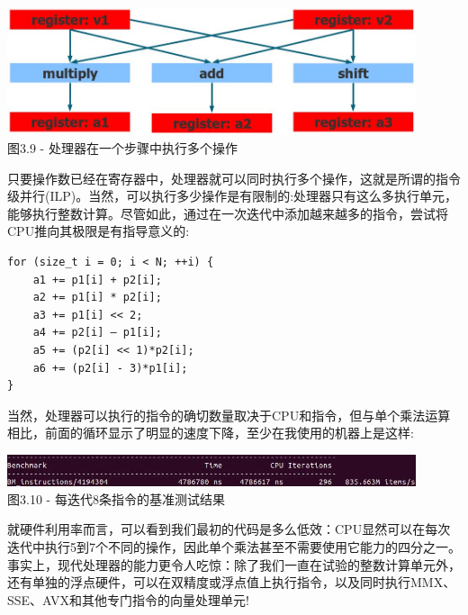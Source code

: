 \hspace*{\fill} \\ %
\begin{center}
\includegraphics[width=0.9\textwidth]{content/1/chapter3/images/9.jpg}\\
图3.9 - 处理器在一个步骤中执行多个操作
\end{center}

只要操作数已经在寄存器中，处理器就可以同时执行多个操作，这就是所谓的指令级并行(ILP)。当然，可以执行多少操作是有限制的:处理器只有这么多执行单元，能够执行整数计算。尽管如此，通过在一次迭代中添加越来越多的指令，尝试将CPU推向其极限是有指导意义的:

\begin{lstlisting}[style=styleCXX]
for (size_t i = 0; i < N; ++i) {
	a1 += p1[i] + p2[i];
	a2 += p1[i] * p2[i];
	a3 += p1[i] << 2;
	a4 += p2[i] – p1[i];
	a5 += (p2[i] << 1)*p2[i];
	a6 += (p2[i] - 3)*p1[i];
}
\end{lstlisting}

当然，处理器可以执行的指令的确切数量取决于CPU和指令，但与单个乘法运算相比，前面的循环显示了明显的速度下降，至少在我使用的机器上是这样:

\begin{center}
\includegraphics[width=0.9\textwidth]{content/1/chapter3/images/10.jpg}\\
图3.10 - 每迭代8条指令的基准测试结果
\end{center}

就硬件利用率而言，可以看到我们最初的代码是多么低效：CPU显然可以在每次迭代中执行5到7个不同的操作，因此单个乘法甚至不需要使用它能力的四分之一。事实上，现代处理器的能力更令人吃惊：除了我们一直在试验的整数计算单元外，还有单独的浮点硬件，可以在双精度或浮点值上执行指令，以及同时执行MMX、SSE、AVX和其他专门指令的向量处理单元!


